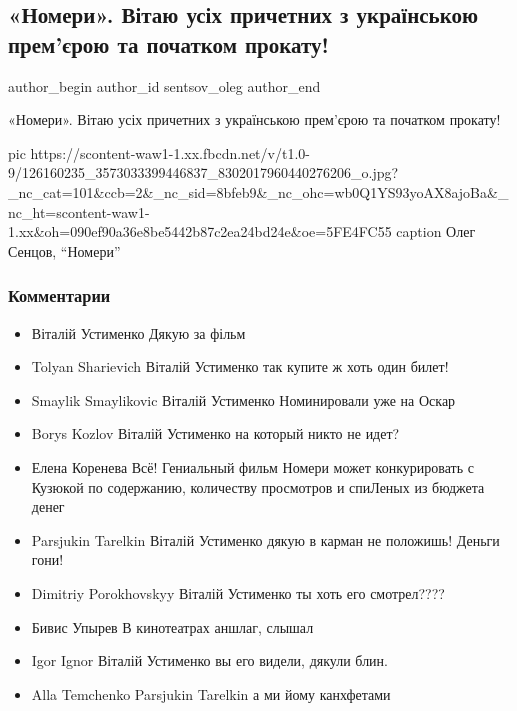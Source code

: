  
 
 
 
 
 
\subsection{«Номери». Вітаю усіх причетних з українською прем’єрою та початком прокату!}
\label{sec:18_11_2020.fb.sentsov_oleg.1.nomery}
\ifcmt
	author_begin
   author_id sentsov_oleg
	author_end
\fi

«Номери». Вітаю усіх причетних з українською прем’єрою та початком прокату!

\ifcmt
pic https://scontent-waw1-1.xx.fbcdn.net/v/t1.0-9/126160235_3573033399446837_8302017960440276206_o.jpg?_nc_cat=101&ccb=2&_nc_sid=8bfeb9&_nc_ohc=wb0Q1YS93yoAX8ajoBa&_nc_ht=scontent-waw1-1.xx&oh=090ef90a36e8be5442b87c2ea24bd24e&oe=5FE4FC55
caption Олег Сенцов, \enquote{Номери}
\fi

\subsubsection{Комментарии}

\begin{itemize}
\item Віталій Устименко
Дякую за фільм
\item Tolyan Sharievich
Віталій Устименко
так купите ж хоть один билет!

\item Smaylik Smaylikovic
Віталій Устименко
Номинировали уже на Оскар

\item Borys Kozlov
Віталій Устименко
на который никто не идет?

\item Елена Коренева
Всё! Гениальный фильм Номери может конкурировать с Кузюкой по содержанию, количеству просмотров и спиЛеных из бюджета денег 

\item Parsjukin Tarelkin
Віталій Устименко
дякую в карман не положишь! Деньги гони!

\item Dimitriy Porokhovskyy
Віталій Устименко
ты хоть его смотрел????

\item Бивис Упырев
В кинотеатрах аншлаг, слышал

\item Igor Ignor
Віталій Устименко
вы его видели, дякули блин.

\item Alla Temchenko
Parsjukin Tarelkin
а ми йому канхфетами

\end{itemize}
